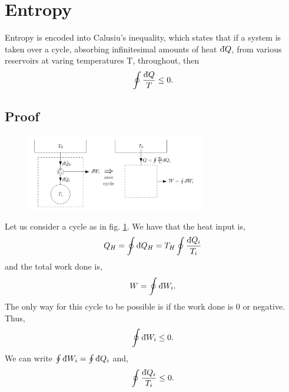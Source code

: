 \documentclass{book}
\newcommand{\dbar}{\mathrm{d}\hspace*{-0.08em}\bar{}\hspace*{0.1em}}
\begin{document}
\section{Entropy}
Entropy is encoded into Calusiu's inequality, which states that if a system is taken over a cycle, absorbing infinitesimal amounts of heat $\dbar Q$, from various reservoirs at varing temperatures T, throughout, then
\begin{equation}
	\oint \frac{\dbar Q}{T} \leq 0.
\end{equation}
\subsection{Proof}
\begin{figure}
	\centering
	\includegraphics[width=0.7\textwidth]{clausius.png}
	\caption{}
	\label{fig:clausius}
\end{figure}
Let us consider a cycle as in fig. \ref{fig:clausius}. We have that the heat input is,
\begin{equation}
	Q_H = \oint\dbar Q_H = T_H \oint\frac{\dbar Q_i}{T_i}
\end{equation}
and the total work done is,
\begin{equation}
	W = \oint \dbar W_i.
\end{equation}
The only way for this cycle to be possible is if the work done is 0 or negative. Thus,
\begin{equation}
	\oint\dbar W_i \leq 0.
\end{equation}
We can write $\oint \dbar W_i = \oint \dbar Q_i$ and,
\begin{equation}
	\oint \frac{\dbar Q_i}{T_i} \leq 0.
\end{equation}
\end{document}
